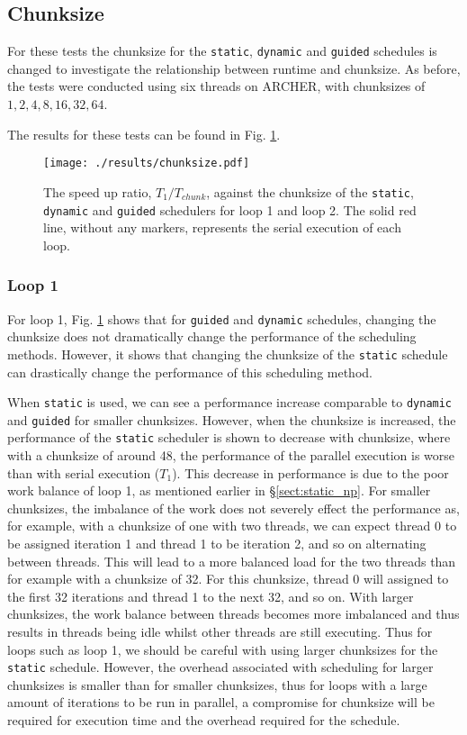 \documentclass[11pt, a4paper]{article}
\begin{document}
		\subsection{Chunksize} \label{sect:chunksize}
			For these tests the chunksize for the \texttt{static}, \texttt{dynamic} and \texttt{guided} schedules is changed to investigate the relationship between runtime and chunksize. As before, the tests were conducted using six threads on ARCHER, with chunksizes of $1, 2, 4, 8, 16, 32, 64$.
			
			The results for these tests can be found in Fig. \ref{fig:chunksize}. 
			
			\begin{figure}
				\centering
				\texttt{[image: ./results/chunksize.pdf]}
				\caption{The speed up ratio, $T_{1}/T_{chunk}$, against the chunksize of the \texttt{static}, \texttt{dynamic} and \texttt{guided} schedulers for loop 1 and loop 2. The solid red line, without any markers, represents the serial execution of each loop.}
				\label{fig:chunksize}
			\end{figure}
			
			\subsubsection{Loop 1} \label{sect:loop1_chunks}
				For loop 1, Fig. \ref{fig:chunksize} shows that for \texttt{guided} and \texttt{dynamic} schedules, changing the chunksize does not dramatically change the performance of the scheduling methods. However, it shows that changing the chunksize of the \texttt{static} schedule can drastically change the performance of this scheduling method. 
				
				When \texttt{static} is used, we can see a performance increase comparable to \texttt{dynamic} and \texttt{guided} for smaller chunksizes. However, when the chunksize is increased, the performance of the \texttt{static} scheduler is shown to decrease with chunksize, where with a chunksize of around 48, the performance of the parallel execution is worse than with serial execution ($T_{1}$). This decrease in performance is due to the poor work balance of loop 1, as mentioned earlier in \S\ref{sect:static_np}. For smaller chunksizes, the imbalance of the work does not severely effect the performance as, for example, with a chunksize of one with two threads, we can expect thread 0 to be assigned iteration 1 and thread 1 to be iteration 2, and so on alternating between threads. This will lead to a more balanced load for the two threads than for example with a chunksize of 32. For this chunksize, thread 0 will assigned to the first 32 iterations and thread 1 to the next 32, and so on. With larger chunksizes, the work balance between threads becomes more imbalanced and thus results in threads being idle whilst other threads are still executing. Thus for loops such as loop 1, we should be careful with using larger chunksizes for the \texttt{static} schedule. However, the overhead associated with scheduling for larger chunksizes is smaller than for smaller chunksizes, thus for loops with a large amount of iterations to be run in parallel, a compromise for chunksize will be required for execution time and the overhead required for the schedule.
\end{document}
